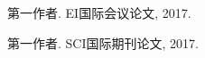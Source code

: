 
\begin{publications}{99}
    \item\textsc{第一作者}. {EI国际会议论文}, 2017.  
    \item\textsc{第一作者}. {SCI国际期刊论文}, 2017.
\end{publications}
